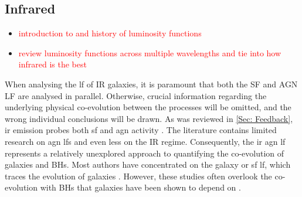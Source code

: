 \subsection{Infrared}

\begin{itemize}
    \item \textcolor{red}{introduction to and history of luminosity functions}
    \item \textcolor{red}{review luminosity functions across multiple wavelengths and tie into how infrared is the best}
\end{itemize}

When analysing the \gls{lf} of IR galaxies, it is paramount that both the SF and AGN LF are analysed in parallel. Otherwise, crucial information regarding the underlying physical co-evolution between the processes will be omitted, and the wrong individual conclusions will be drawn. As was reviewed in \cref{Sec: Feedback}, \gls{ir} emission probes both \gls{sf} and \gls{agn} activity \citep{fu_decomposing_2010}. The literature contains limited research on \gls{agn} \gls{lf}s and even less on the IR regime. Consequently, the \gls{ir} \gls{agn} \gls{lf} represents a relatively unexplored approach to quantifying the co-evolution of galaxies and BHs. Most authors have concentrated on the galaxy or \gls{sf} \gls{lf}, which traces the evolution of galaxies \citep{cool_galaxy_2012, tempel_tracing_2011}. However, these studies often overlook the co-evolution with BHs \citep{fotopoulou_5-10_2016, symeonidis_agn_2021, finkelstein_coevolution_2022} that galaxies have been shown to depend on \citep{hopkins_cosmological_2008, fiore_agn_2017}.

